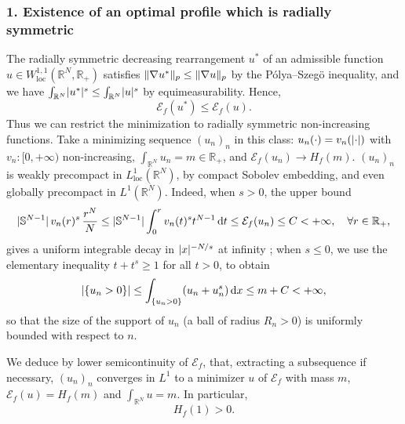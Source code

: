 \documentclass[10pt]{amsart}
\theoremstyle{plain}
\theoremstyle{definition}
\newcommand{\dd}{\mathop{}\mathopen{}\mathrm{d}}
\newcommand{\R}{\mathbb{R}}
\newcommand{\ener}{\mathcal{E}}
\newcommand{\loc}{\mathrm{loc}}
\DeclarePairedDelimiter{\abs}{\lvert}{\rvert}
\DeclarePairedDelimiter{\norm}{\lVert}{\rVert}
\begin{document}
\subsubsection*{\textup{1}. Existence of an optimal profile which is radially symmetric} The radially symmetric decreasing rearrangement $u^*$ of an admissible function $u\in W^{1,1}_{\loc}(\R^N,\R_+)$ satisfies $\norm{\nabla u^*}_p\leq\norm{\nabla u}_p$ by the Pólya–Szegö inequality, and we have $\int_{\R^N}\abs{u^*}^s\leq\int_{\R^N}\abs{u}^s$ by equimeasurability. Hence,
\[\ener_f(u^*)\leq\ener_f(u).\]
Thus we can restrict the minimization to radially symmetric non-increasing functions. Take a minimizing sequence $(u_n)_n$ in this class: $u_n(\cdot)=v_n(\abs{\cdot})$ with $v_n:[0,+\infty)$ non-increasing, $\int_{\R^N}u_n=m\in\R_+$, and $\ener_f(u_n)\to H_f(m)$. $(u_n)_n$ is weakly precompact in $L^1_{\loc}(\R^N)$, by compact Sobolev embedding, and even globally precompact in $L^1(\R^N)$. Indeed, when $s > 0$, the upper bound
\[\abs{\mathbb{S}^{N-1}}\,v_n(r)^s\, \frac{r^N}N\leq \abs{\mathbb{S}^{N-1}}\int_0^r v_n(t)^s t^{N-1}\dd t\leq\ener_f(u_n)\leq C<+\infty,\quad\forall r\in\R_+,\]
gives a uniform integrable decay in $\abs{x}^{-N/s}$ at infinity ; when $s\leq 0$, we use the elementary inequality $t+t^s\geq 1$ for all $t>0$, to obtain\vspace*{-3pt}
\begin{equation}
\label{compatnessSupport}
\abs{\{u_n>0\}}\leq \int_{\{u_n>0\}} (u_n+ u_n^s) \dd x\leq m+C<+\infty,
\end{equation}
so that the size of the support of $u_n$ (a ball of radius $R_n>0$) is uniformly bounded with respect to $n$.

We deduce by lower semicontinuity of $\ener_f$, that, extracting a subsequence if necessary, $(u_n)_n$ converges in $L^1$ to a minimizer $u$ of $\ener_f$ with mass $m$, \ie $\ener_f(u)=H_f(m)$ and $\int_{\R^N}u=m$. In particular,\vspace*{-3pt}\enlargethispage{\baselineskip}
\[
H_f(1)>0.
\]
\end{document}
